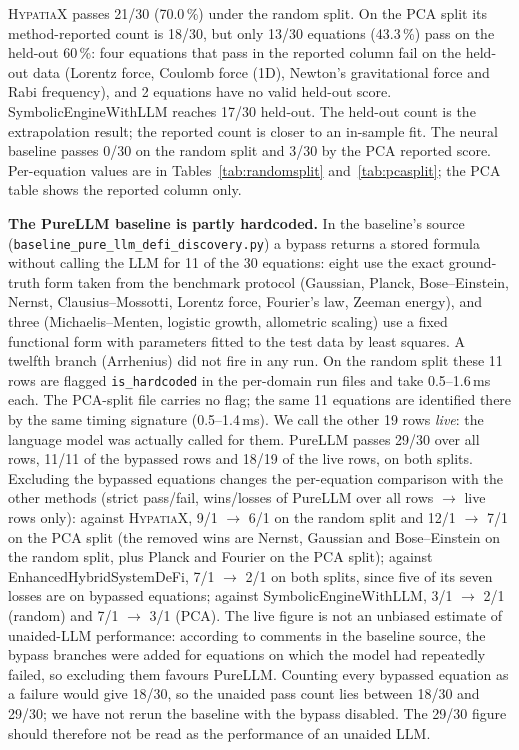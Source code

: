 \documentclass[twoside,11pt]{article}
\begin{document}
\textsc{HypatiaX} passes 21/30 (70.0\,\%) under the random split. On the PCA split its method-reported
count is 18/30, but only 13/30 equations (43.3\,\%) pass on the held-out 60\,\%: four equations that pass in
the reported column fail on the held-out data (Lorentz force, Coulomb force (1D), Newton's gravitational force and
Rabi frequency), and 2 equations have no valid held-out score. SymbolicEngineWithLLM reaches 17/30 held-out. The
held-out count is the extrapolation result; the reported count is closer to an in-sample fit. The neural baseline
passes 0/30 on the random split and 3/30 by the PCA reported score. Per-equation values are in
Tables~\ref{tab:randomsplit} and~\ref{tab:pcasplit}; the PCA table shows the reported column only.

\textbf{The PureLLM baseline is partly hardcoded.} In the baseline's source
(\texttt{baseline\_pure\_llm\_defi\_discovery.py}) a bypass returns a stored formula without calling the LLM
for 11 of the 30 equations: eight use the exact ground-truth form taken from the benchmark protocol
(Gaussian, Planck, Bose--Einstein, Nernst, Clausius--Mossotti, Lorentz force, Fourier's law, Zeeman energy), and three
(Michaelis--Menten, logistic growth, allometric scaling) use a fixed functional form with parameters fitted to the
test data by least squares. A twelfth branch (Arrhenius) did not fire in any run. On the random split these 11 rows
are flagged \texttt{is\_hardcoded} in the per-domain run files and take 0.5--1.6\,ms each. The PCA-split file carries
no flag; the same 11 equations are identified there by the same timing signature (0.5--1.4\,ms). We call the other
19 rows \emph{live}: the language model was actually called for them. PureLLM passes 29/30 over all rows, 11/11 of the
bypassed rows and 18/19 of the live rows, on both splits. Excluding the bypassed equations changes the per-equation
comparison with the other methods (strict pass/fail, wins/losses of PureLLM over all rows $\rightarrow$ live rows only):
against \textsc{HypatiaX}, 9/1 $\rightarrow$ 6/1 on the random split and 12/1 $\rightarrow$ 7/1 on the PCA split (the removed
wins are Nernst, Gaussian and Bose--Einstein on the random split, plus Planck and Fourier on the PCA split); against
EnhancedHybridSystemDeFi, 7/1 $\rightarrow$ 2/1 on both splits, since five of its seven losses are on bypassed equations;
against SymbolicEngineWithLLM, 3/1 $\rightarrow$ 2/1 (random) and 7/1 $\rightarrow$ 3/1 (PCA). The live figure is not an
unbiased estimate of unaided-LLM performance: according to comments in the baseline source, the bypass branches were
added for equations on which the model had repeatedly failed, so excluding them favours PureLLM. Counting every bypassed
equation as a failure would give 18/30, so the unaided pass count lies between 18/30 and 29/30; we have not rerun the
baseline with the bypass disabled. The 29/30 figure should therefore not be read as the performance of an unaided LLM.
\end{document}
